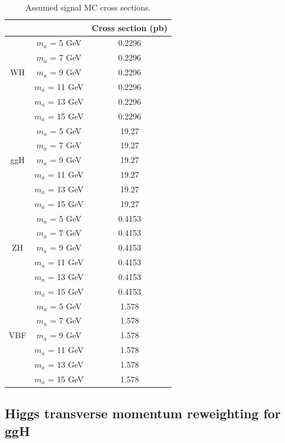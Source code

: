 \begin{table}[htbh]
\begin{center}
\caption{Assumed signal MC cross sections.\label{tab:MC-sig}}
\begin{tabular}{|c|c|c|}
\hline
\multicolumn{2}{|c|}{} & Cross section (pb) \\
\hline
\multirow{5}{*}{WH} & $m_{a}$ = 5 GeV & 0.2296\\
& $m_{a}$ = 7 GeV & 0.2296\\
& $m_{a}$ = 9 GeV & 0.2296\\
& $m_{a}$ = 11 GeV & 0.2296\\
& $m_{a}$ = 13 GeV & 0.2296\\
& $m_{a}$ = 15 GeV & 0.2296\\
\hline
\multirow{5}{*}{ggH} & $m_{a}$ = 5 GeV & 19.27\\
& $m_{a}$ = 7 GeV & 19.27\\
& $m_{a}$ = 9 GeV & 19.27\\
& $m_{a}$ = 11 GeV & 19.27\\
& $m_{a}$ = 13 GeV & 19.27\\
& $m_{a}$ = 15 GeV & 19.27\\
\hline
\multirow{5}{*}{ZH} & $m_{a}$ = 5 GeV & 0.4153\\
& $m_{a}$ = 7 GeV & 0.4153\\
& $m_{a}$ = 9 GeV & 0.4153\\
& $m_{a}$ = 11 GeV & 0.4153\\
& $m_{a}$ = 13 GeV & 0.4153\\
& $m_{a}$ = 15 GeV & 0.4153\\
\hline
\multirow{5}{*}{VBF} & $m_{a}$ = 5 GeV & 1.578\\
& $m_{a}$ = 7 GeV & 1.578\\
& $m_{a}$ = 9 GeV & 1.578\\
& $m_{a}$ = 11 GeV & 1.578\\
& $m_{a}$ = 13 GeV & 1.578\\
& $m_{a}$ = 15 GeV & 1.578\\
\hline
\end{tabular}
\end{center}
\end{table}

\subsection{Higgs transverse momentum reweighting for ggH\label{sec:datasets-higgsptreweight}}

